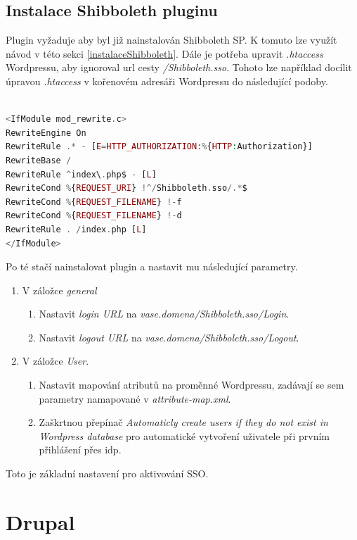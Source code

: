 \subsection{Instalace Shibboleth pluginu} %
Plugin vyžaduje aby byl již nainstalován Shibboleth SP. K tomuto lze využít návod v této sekci \ref{instalaceShibboleth}. Dále je potřeba upravit \emph{.htaccess} Wordpressu, aby ignoroval url cesty \emph{/Shibboleth.sso}. Tohoto lze například docílit úpravou \emph{.htaccess} v kořenovém adresáři Wordpressu do následující podoby.

\begin{lstlisting}[language=php]

<IfModule mod_rewrite.c>
RewriteEngine On
RewriteRule .* - [E=HTTP_AUTHORIZATION:%{HTTP:Authorization}]
RewriteBase /
RewriteRule ^index\.php$ - [L]
RewriteCond %{REQUEST_URI} !^/Shibboleth.sso/.*$
RewriteCond %{REQUEST_FILENAME} !-f
RewriteCond %{REQUEST_FILENAME} !-d
RewriteRule . /index.php [L]
</IfModule>


\end{lstlisting}

Po té stačí nainstalovat plugin a nastavit mu následující parametry.

\begin{enumerate}
    \item V záložce \emph{general}
    \begin{enumerate}
        \item Nastavit \emph{login URL} na \emph{vase.domena/Shibboleth.sso/Login}.
        \item Nastavit \emph{logout URL} na \emph{vase.domena/Shibboleth.sso/Logout}.
    \end{enumerate}
    \item V záložce \emph{User}.
     \begin{enumerate}
        \item Nastavit mapování atributů na proměnné Wordpressu, zadávají se sem parametry namapované v \emph{attribute-map.xml}.
        \item Zaškrtnou přepínač \emph{Automaticly create users if they do not exist in Wordpress database} pro automatické vytvoření uživatele při prvním přihlášení přes idp.
     \end{enumerate}
\end{enumerate}

Toto je základní nastavení pro aktivování SSO.

\section{Drupal} %

